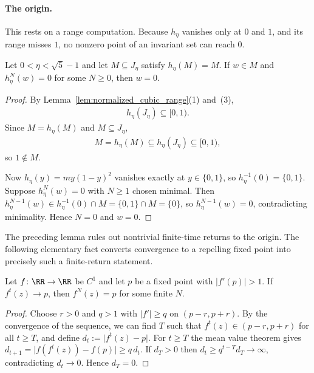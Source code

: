 \documentclass{article}
\begin{document}
\paragraph{The origin.}
This rests on a range computation. Because $h_\eta$
vanishes only at $0$ and $1$, and its range misses $1$, no nonzero point of an
invariant set can reach $0$.

\begin{lemma}
\label{lem:no_return_to_zero}
Let $0<\eta<\sqrt5-1$ and let $M\subseteq J_\eta$ satisfy $h_\eta(M)=M$. If
$w\in M$ and $h_\eta^N(w)=0$ for some $N\ge0$, then $w=0$.
\end{lemma}

\begin{proof}
By Lemma~\ref{lem:normalized_cubic_range}(1) and~(3),
\begin{align}
    h_\eta(J_\eta)\subseteq[0,1).
\end{align}
Since $M=h_\eta(M)$ and $M\subseteq J_\eta$,
\begin{align}
    M=h_\eta(M)\subseteq h_\eta(J_\eta)\subseteq[0,1),
\end{align}
so $1\notin M$.

Now $h_\eta(y)=my(1-y)^2$ vanishes exactly at $y\in\{0,1\}$, so
$h_\eta^{-1}(0)=\{0,1\}$. Suppose $h_\eta^N(w)=0$ with $N\ge1$ chosen minimal.
Then $h_\eta^{N-1}(w)\in h_\eta^{-1}(0)\cap M=\{0,1\}\cap M=\{0\}$, so
$h_\eta^{N-1}(w)=0$, contradicting minimality. Hence $N=0$ and $w=0$.
\end{proof}

The preceding lemma rules out nontrivial finite-time returns to the origin. The
following elementary fact converts convergence to a repelling fixed point into
precisely such a finite-return statement.

\begin{lemma}
\label{lem:repeller_exact_hit}
Let $f\colon\RR\to\RR$ be $C^1$ and let $p$ be a fixed point with
$\lvert f'(p)\rvert>1$. If $f^t(z)\to p$, then $f^N(z)=p$ for some finite
$N$.
\end{lemma}

\begin{proof}
Choose $r>0$ and $q>1$ with $\lvert f'\rvert\ge q$ on $(p-r,p+r)$.
By the convergence of the sequence, we can find $T$ such that $f^t(z)\in(p-r,p+r)$ for all $t\ge T$, and define
$d_t:=\lvert f^t(z)-p\rvert$. For $t\ge T$ the mean value theorem gives
$d_{t+1}=\lvert f(f^t(z))-f(p)\rvert\ge q\,d_t$. If $d_T>0$ then $d_t\ge q^{t-T}d_T\to\infty$,
contradicting $d_t\to0$. Hence $d_T=0$.
\end{proof}
\end{document}
